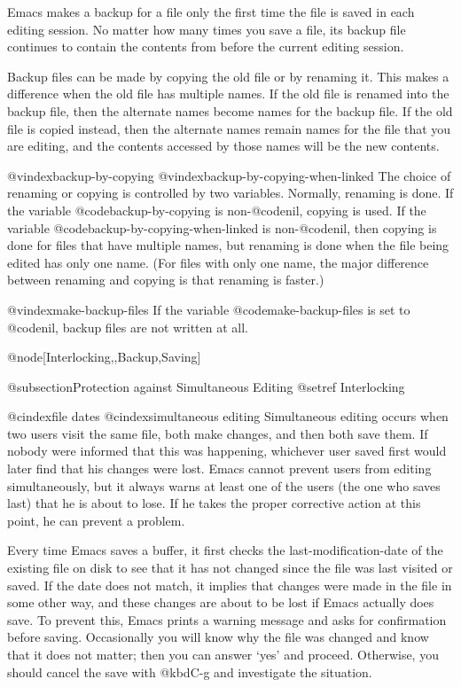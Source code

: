 {{{{{{{{{{{{{{{{{{  Emacs makes a backup for a file only the first time the file is saved in
each editing session.  No matter how many times you save a file, its backup
file continues to contain the contents from before the current editing session.

  Backup files can be made by copying the old file or by renaming it.
This makes a difference when the old file has multiple names.  If the
old file is renamed into the backup file, then the alternate names become
names for the backup file.  If the old file is copied instead, then the
alternate names remain names for the file that you are editing, and
the contents accessed by those names will be the new contents.

@vindex{backup-by-copying}
@vindex{backup-by-copying-when-linked}
  The choice of renaming or copying is controlled by two variables.
Normally, renaming is done.  If the variable @code{backup-by-copying} is
non-@code{nil}, copying is used.  If the variable
@code{backup-by-copying-when-linked} is non-@code{nil}, then copying is
done for files that have multiple names, but renaming is done when the file
being edited has only one name.  (For files with only one name,
the major difference between renaming and copying is that renaming is faster.)

@vindex{make-backup-files}
  If the variable @code{make-backup-files} is set to @code{nil}, backup
files are not written at all.

@node[Interlocking,,Backup,Saving]

@subsection{Protection against Simultaneous Editing}
@setref Interlocking

@cindex{file dates}
@cindex{simultaneous editing}
  Simultaneous editing occurs when two users visit the same file, both make
changes, and then both save them.  If nobody were informed that this was
happening, whichever user saved first would later find that his changes
were lost.  Emacs cannot prevent users from editing simultaneously, but it
always warns at least one of the users (the one who saves last) that he is
about to lose.  If he takes the proper corrective action at this point, he
can prevent a problem.

  Every time Emacs saves a buffer, it first checks the
last-modification-date of the existing file on disk to see that it has not
changed since the file was last visited or saved.  If the date does not
match, it implies that changes were made in the file in some other way, and
these changes are about to be lost if Emacs actually does save.  To prevent
this, Emacs prints a warning message and asks for confirmation before
saving.  Occasionally you will know why the file was changed and know that
it does not matter; then you can answer `yes' and proceed.  Otherwise, you
should cancel the save with @kbd{C-g} and investigate the situation.

}}}}}}}}}}}}}}}}}}
